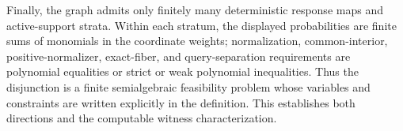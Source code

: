 Finally, the graph admits only finitely many deterministic response maps and active-support strata.  Within each stratum, the displayed probabilities are finite sums of monomials in the coordinate weights; normalization, common-interior, positive-normalizer, exact-fiber, and query-separation requirements are polynomial equalities or strict or weak polynomial inequalities.  Thus the disjunction is a finite semialgebraic feasibility problem whose variables and constraints are written explicitly in the definition.  This establishes both directions and the computable witness characterization.
